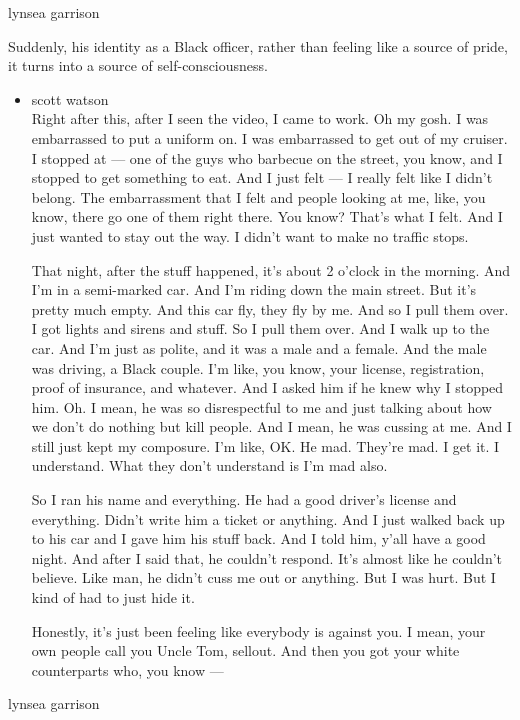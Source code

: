 lynsea garrison

Suddenly, his identity as a Black officer, rather than feeling like a
source of pride, it turns into a source of self-consciousness.

\begin{itemize}
\item
  scott watson\\
  Right after this, after I seen the video, I came to work. Oh my gosh.
  I was embarrassed to put a uniform on. I was embarrassed to get out of
  my cruiser. I stopped at --- one of the guys who barbecue on the
  street, you know, and I stopped to get something to eat. And I just
  felt --- I really felt like I didn't belong. The embarrassment that I
  felt and people looking at me, like, you know, there go one of them
  right there. You know? That's what I felt. And I just wanted to stay
  out the way. I didn't want to make no traffic stops.

  That night, after the stuff happened, it's about 2 o'clock in the
  morning. And I'm in a semi-marked car. And I'm riding down the main
  street. But it's pretty much empty. And this car fly, they fly by me.
  And so I pull them over. I got lights and sirens and stuff. So I pull
  them over. And I walk up to the car. And I'm just as polite, and it
  was a male and a female. And the male was driving, a Black couple. I'm
  like, you know, your license, registration, proof of insurance, and
  whatever. And I asked him if he knew why I stopped him. Oh. I mean, he
  was so disrespectful to me and just talking about how we don't do
  nothing but kill people. And I mean, he was cussing at me. And I still
  just kept my composure. I'm like, OK. He mad. They're mad. I get it. I
  understand. What they don't understand is I'm mad also.

  So I ran his name and everything. He had a good driver's license and
  everything. Didn't write him a ticket or anything. And I just walked
  back up to his car and I gave him his stuff back. And I told him,
  y'all have a good night. And after I said that, he couldn't respond.
  It's almost like he couldn't believe. Like man, he didn't cuss me out
  or anything. But I was hurt. But I kind of had to just hide it.

  Honestly, it's just been feeling like everybody is against you. I
  mean, your own people call you Uncle Tom, sellout. And then you got
  your white counterparts who, you know ---
\end{itemize}

lynsea garrison

